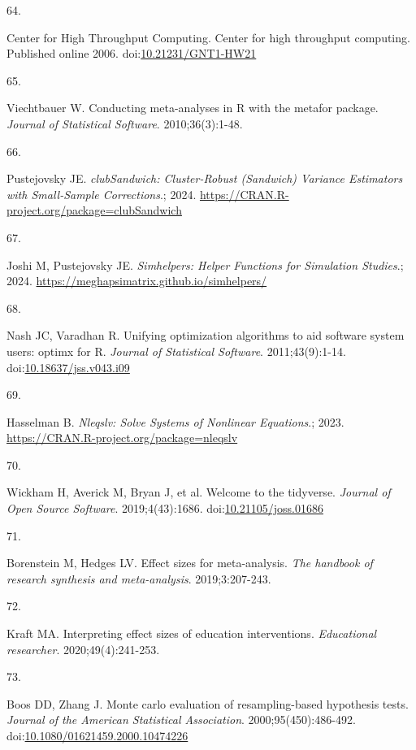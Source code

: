 \documentclass[
  man, donotrepeattitle,floatsintext]{apa7}
\newlength{\cslhangindent}
\newlength{\csllabelwidth}
\newenvironment{CSLReferences}[2] %
 {\begin{list}{}{%
  \setlength{\itemindent}{0pt}
  \setlength{\leftmargin}{0pt}
  \setlength{\parsep}{0pt}
  \ifodd #1
   \setlength{\leftmargin}{\cslhangindent}
   \setlength{\itemindent}{-1\cslhangindent}
  \fi
  \setlength{\itemsep}{#2\baselineskip}}}
 {\end{list}}
\newcommand{\CSLLeftMargin}[1]{\parbox[t]{\csllabelwidth}{\strut#1\strut}}
\newcommand{\CSLRightInline}[1]{\parbox[t]{\linewidth - \csllabelwidth}{\strut#1\strut}}
\begin{document}
\begin{CSLReferences}{0}{1}
\CSLLeftMargin{64. }%
\CSLRightInline{Center for High Throughput Computing. Center for high throughput computing. Published online 2006. doi:\href{https://doi.org/10.21231/GNT1-HW21}{10.21231/GNT1-HW21}}

\CSLLeftMargin{65. }%
\CSLRightInline{Viechtbauer W. {Conducting meta-analyses in R with the metafor package}. \emph{Journal of Statistical Software}. 2010;36(3):1-48.}

\CSLLeftMargin{66. }%
\CSLRightInline{Pustejovsky JE. \emph{clubSandwich: Cluster-Robust (Sandwich) Variance Estimators with Small-Sample Corrections}.; 2024. \url{https://CRAN.R-project.org/package=clubSandwich}}

\CSLLeftMargin{67. }%
\CSLRightInline{Joshi M, Pustejovsky JE. \emph{Simhelpers: Helper Functions for Simulation Studies}.; 2024. \url{https://meghapsimatrix.github.io/simhelpers/}}

\CSLLeftMargin{68. }%
\CSLRightInline{Nash JC, Varadhan R. Unifying optimization algorithms to aid software system users: {optimx} for {R}. \emph{Journal of Statistical Software}. 2011;43(9):1-14. doi:\href{https://doi.org/10.18637/jss.v043.i09}{10.18637/jss.v043.i09}}

\CSLLeftMargin{69. }%
\CSLRightInline{Hasselman B. \emph{Nleqslv: Solve Systems of Nonlinear Equations}.; 2023. \url{https://CRAN.R-project.org/package=nleqslv}}

\CSLLeftMargin{70. }%
\CSLRightInline{Wickham H, Averick M, Bryan J, et al. Welcome to the {tidyverse}. \emph{Journal of Open Source Software}. 2019;4(43):1686. doi:\href{https://doi.org/10.21105/joss.01686}{10.21105/joss.01686}}

\CSLLeftMargin{71. }%
\CSLRightInline{Borenstein M, Hedges LV. Effect sizes for meta-analysis. \emph{The handbook of research synthesis and meta-analysis}. 2019;3:207-243.}

\CSLLeftMargin{72. }%
\CSLRightInline{Kraft MA. Interpreting effect sizes of education interventions. \emph{Educational researcher}. 2020;49(4):241-253.}

\CSLLeftMargin{73. }%
\CSLRightInline{Boos DD, Zhang J. Monte carlo evaluation of resampling-based hypothesis tests. \emph{Journal of the American Statistical Association}. 2000;95(450):486-492. doi:\href{https://doi.org/10.1080/01621459.2000.10474226}{10.1080/01621459.2000.10474226}}


\end{CSLReferences}
\end{document}
